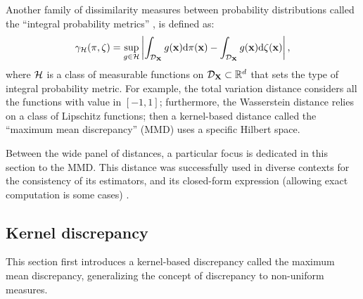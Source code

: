 Another family of dissimilarity measures between probability distributions called the ``integral probability metrics'' \citep{muller_1997_ipm}, is defined as: 
\begin{equation}
    \gamma_{\mathcal{H}}(\pi, \zeta) = \sup_{g \in \mathcal{H}} \left | \int_{\mathcal{D}_{{\bf X}}} g({\bf x}) \mathrm{d} \pi({\bf x}) - \int_{\mathcal{D}_{{\bf X}}} g({\bf x}) \mathrm{d} \zeta({\bf x}) \right|,
    \label{eq:ipm}  
\end{equation}
where $\mathcal{H}$ is a class of measurable functions on $\mathcal{D}_{{\bf X}} \subset \mathbb{R}^d$ that sets the type of integral probability metric.   
For example, the total variation distance considers all the functions with value in $[-1, 1]$; 
furthermore, the Wasserstein distance relies on a class of Lipschitz functions; 
then a kernel-based distance called the ``maximum mean discrepancy'' (MMD) uses a specific Hilbert space. 

Between the wide panel of distances\footnotemark, a particular focus is dedicated in this section to the MMD. 
This distance was successfully used in diverse contexts for the consistency of its estimators, and its closed-form expression (allowing exact computation is some cases) \citep{sriperumbudur_2012}. 




\subsection*{Kernel discrepancy}

This section first introduces a kernel-based discrepancy called the maximum mean discrepancy, generalizing the concept of discrepancy to non-uniform measures.

